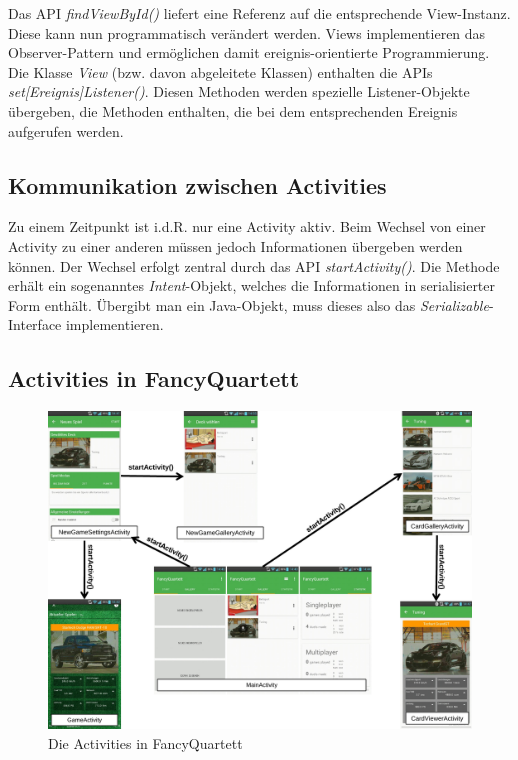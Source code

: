 Das API \emph{findViewById()} liefert eine Referenz auf die entsprechende View-Instanz. Diese kann nun programmatisch verändert werden. Views implementieren das Observer-Pattern und ermöglichen damit ereignis-orientierte Programmierung. Die Klasse \emph{View} (bzw. davon abgeleitete Klassen) enthalten die APIs \emph{set[Ereignis]Listener()}. Diesen Methoden werden spezielle Listener-Objekte übergeben, die Methoden enthalten, die bei dem entsprechenden Ereignis aufgerufen werden.

\subsection{Kommunikation zwischen Activities}

Zu einem Zeitpunkt ist i.d.R. nur eine Activity aktiv. Beim Wechsel von einer Activity zu einer anderen müssen jedoch Informationen übergeben werden können. Der Wechsel erfolgt zentral durch das API \emph{startActivity()}. Die Methode erhält ein sogenanntes \emph{Intent}-Objekt, welches die Informationen in serialisierter Form enthält. Übergibt man ein Java-Objekt, muss dieses also das \emph{Serializable}-Interface implementieren.

\subsection{Activities in FancyQuartett}

\begin{figure}[ht]
    \centering
    \includegraphics[width=\textwidth]{../img/Activities.pdf}
    \caption{Die Activities in FancyQuartett}
    \label{fig:activities_in_fancyquartett}
\end{figure}

